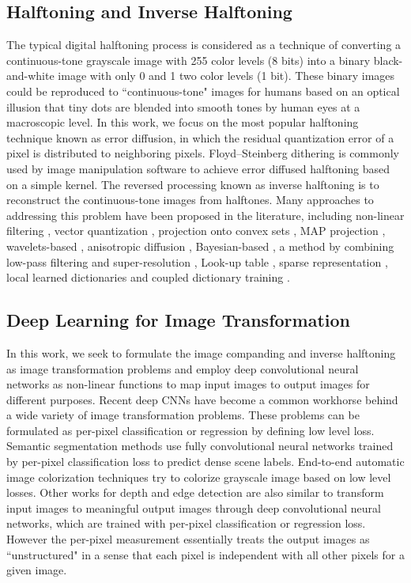 \documentclass[journal]{IEEEtran}
\begin{document}
\subsection{Halftoning and Inverse Halftoning}
The typical digital halftoning process is considered as a technique of converting a continuous-tone grayscale image with 255 color levels (8 bits) into a binary black-and-white image with only 0 and 1 two color levels (1 bit). These binary images could be reproduced to ``continuous-tone" images for humans based on an optical illusion that tiny dots are blended into smooth tones by human eyes at a macroscopic level. In this work, we focus on the most popular halftoning technique known as error diffusion, in which the residual quantization error of a pixel is distributed to neighboring pixels. Floyd–Steinberg dithering is commonly used by image manipulation software to achieve error diffused halftoning based on a simple kernel. The reversed processing known as inverse halftoning is to reconstruct the continuous-tone images from halftones. Many approaches to addressing this problem have been proposed in the literature, including non-linear filtering \cite{shen2001robust}, vector quantization \cite{ting1994error}, projection onto convex sets \cite{unal2001restoration}, MAP projection \cite{stevenson1997inverse}, wavelets-based \cite{neelamani2002winhd}, anisotropic diffusion \cite{kite2000fast}, Bayesian-based \cite{liu2011inverse}, a method by combining low-pass filtering and super-resolution \cite{minami2012inverse}, Look-up table \cite{mese2001look}, sparse representation \cite{son2012inverse}, local learned dictionaries \cite{son2014local} and coupled dictionary training \cite{freitas2016enhancing}.

\subsection{Deep Learning for Image Transformation}
In this work, we seek to formulate the image companding and inverse halftoning as image transformation problems and employ deep convolutional neural networks as non-linear functions to map input images to output images for different purposes. Recent deep CNNs have become a common workhorse behind a wide variety of image transformation problems. These problems can be formulated as per-pixel classification or regression by defining low level loss. Semantic segmentation methods \cite{long2015fully,eigen2015predicting,noh2015learning} use fully convolutional neural networks trained by per-pixel classification loss to predict dense scene labels. End-to-end automatic image colorization techniques \cite{iizuka2016let,larsson2016learning} try to colorize grayscale image based on low level losses. Other works for depth \cite{eigen2014depth,liu2015deep} and edge detection \cite{xie2015holistically} are also similar to transform input images to meaningful output images through deep convolutional neural networks, which are trained with per-pixel classification or regression loss. However the per-pixel measurement essentially treats the output images as ``unstructured" in a sense that each pixel is independent with all other pixels for a given image.
\end{document}
